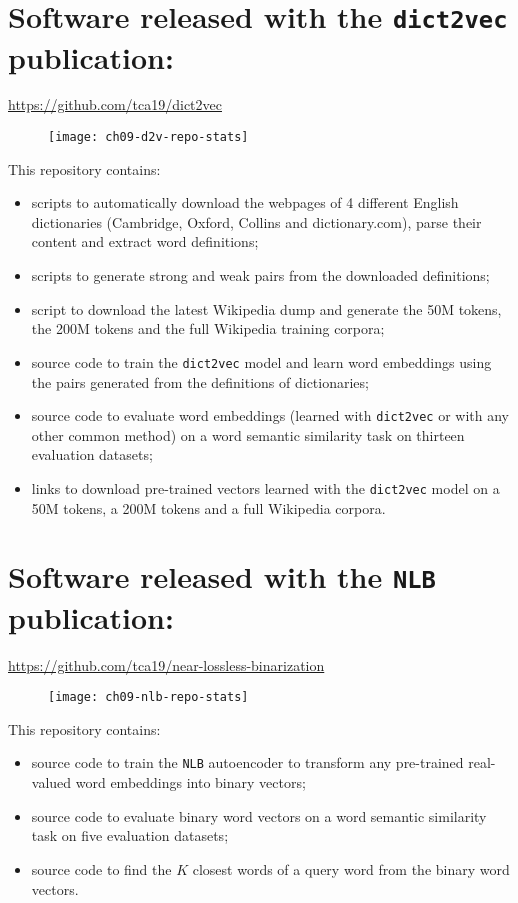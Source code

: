 
\section*{Software released with the \texttt{dict2vec} publication:}
  \url{https://github.com/tca19/dict2vec}

  \begin{figure}[h]
    \texttt{[image: ch09-d2v-repo-stats]}
  \end{figure}

  \noindent This repository contains:

  \begin{itemize}
    \item scripts to automatically download the webpages of 4 different English
      dictionaries (Cambridge, Oxford, Collins and dictionary.com), parse their
      content and extract word definitions;
    \item scripts to generate strong and weak pairs from the downloaded
      definitions;
    \item script to download the latest Wikipedia dump and generate the 50M
      tokens, the 200M tokens and the full Wikipedia training corpora;
    \item source code to train the \texttt{dict2vec} model and learn word
      embeddings using the pairs generated from the definitions of dictionaries;
    \item source code to evaluate word embeddings (learned with
      \texttt{dict2vec} or with any other common method) on a word semantic
      similarity task on thirteen evaluation datasets;
    \item links to download pre-trained vectors learned with the
      \texttt{dict2vec} model on a 50M tokens, a 200M tokens and a full
      Wikipedia corpora.
  \end{itemize}

\section*{Software released with the \texttt{NLB} publication:}
  \url{https://github.com/tca19/near-lossless-binarization}

  \begin{figure}[h]
    \texttt{[image: ch09-nlb-repo-stats]}
  \end{figure}

  \noindent This repository contains:

  \begin{itemize}
    \item source code to train the \texttt{NLB} autoencoder to transform any
      pre-trained real-valued word embeddings into binary vectors;
    \item source code to evaluate binary word vectors on a word semantic
      similarity task on five evaluation datasets;
    \item source code to find the $K$ closest words of a query word from the
      binary word vectors.
  \end{itemize}
